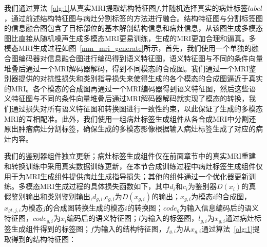 \documentclass[letterpaper]{article} %
\begin{document}
我们通过算法~\ref{alg:1}从真实MRI提取结构特征图$f$,并随机选择真实的病灶标签$label$，通过前述结构特征图与病灶分割标签的方法进行融合。结构特征图与分割标签图的信息融合图包含了目标部位的基本解剖结构信息和病灶信息，从该图生成多模态图比直接从随机噪声生成多模态MRI更易训练，生成的MRI更加合理和逼真。多模态MRI生成过程如图~\ref{mm_mri_generate}所示，首先，我们使用一个单独的融合图编码器对信息融合图进行编码得到语义特征图，语义特征图与不同的条件向量堆叠后通过一个MRI解码器解码，得到不同模态的合成图。我们通过一个MRI鉴别器提供的对抗性损失和类别指导损失来使得生成的各个模态的合成图逼近于真实的MRI。各个模态的合成图再通过一个MRI编码器得到语义特征图，然后这些语义特征图与不同的条件向量堆叠后通过MRI解码器解码就实现了模态的转换，我们通过损失对所有语义特征图和转换图进行一致性约束，以此保证了生成的多模态MRI的互相配准。此外，我们使用一组病灶标签生成组件从各合成MRI中分割还原出肿瘤病灶分割标签，确保生成的多模态影像根据输入病灶标签生成了对应的病灶内容。

我们的鉴别器组件独立更新；病灶标签生成组件仅在前面章节中的真实MRI重建和转换训练中采用真实数据训练更新，在本节合成训练过程中病灶标签生成组件仅用于为MRI生成组件提供病灶生成指导损失；其他的组件通过一个优化器更新训练。多模态MRI生成过程的具体损失函数如下，其中$d_{i}$和$c_{i}$为鉴别器$D(x_i)$的真假鉴别输出和类别鉴别输出,$d_{g,i}$,$c_{g,i}$为$D(x_{g,i})$的输出；$x_{g,i}$为模态$i$的合成图，$x_{gt,j,i}$为模态$j$的合成图转换生成的模态$i$的转换图；$code_g$为输入信息编码后的语义特征图，$code_{g,i}$为$x_i$编码后的语义特征图；$l$为输入的标签图，$l_{g,i}$为$x_{g,i}$通过病灶标签生成组件得到的标签图；$f$为输入的结构特征图，$f_{g,i}$为从$x_{g,i}$通过算法~\ref{alg:1}提取得到的结构特征图：
\end{document}
